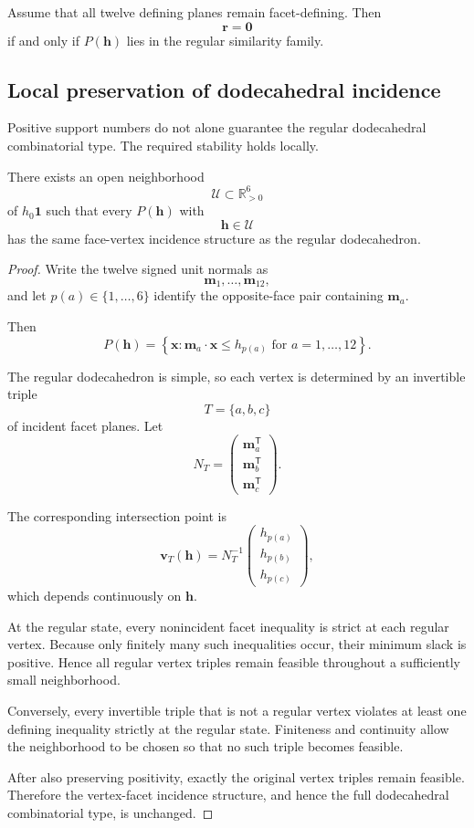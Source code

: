 \begin{corollary}
Assume that all twelve defining planes remain facet-defining. Then
\[
\mathbf r=\mathbf 0
\]
if and only if \(P(\mathbf h)\) lies in the regular similarity family.
\end{corollary}

\subsection{Local preservation of dodecahedral incidence}

Positive support numbers do not alone guarantee the regular dodecahedral
combinatorial type. The required stability holds locally.

\begin{theorem}
There exists an open neighborhood
\[
\mathcal U\subset\mathbb R_{>0}^6
\]
of \(h_0\mathbf 1\) such that every \(P(\mathbf h)\) with
\[
\mathbf h\in\mathcal U
\]
has the same face-vertex incidence structure as the regular dodecahedron.
\end{theorem}

\begin{proof}
Write the twelve signed unit normals as
\[
\mathbf m_1,\ldots,\mathbf m_{12},
\]
and let \(p(a)\in\{1,\ldots,6\}\) identify the opposite-face pair
containing \(\mathbf m_a\).

Then
\[
P(\mathbf h)
=
\left\{
\mathbf x:
\mathbf m_a\cdot\mathbf x
\le
h_{p(a)}
\text{ for }a=1,\ldots,12
\right\}.
\]

The regular dodecahedron is simple, so each vertex is determined by an
invertible triple
\[
T=\{a,b,c\}
\]
of incident facet planes. Let
\[
N_T
=
\begin{pmatrix}
\mathbf m_a^{\mathsf T}\\
\mathbf m_b^{\mathsf T}\\
\mathbf m_c^{\mathsf T}
\end{pmatrix}.
\]

The corresponding intersection point is
\[
\mathbf v_T(\mathbf h)
=
N_T^{-1}
\begin{pmatrix}
h_{p(a)}\\
h_{p(b)}\\
h_{p(c)}
\end{pmatrix},
\]
which depends continuously on \(\mathbf h\).

At the regular state, every nonincident facet inequality is strict at each
regular vertex. Because only finitely many such inequalities occur, their
minimum slack is positive. Hence all regular vertex triples remain feasible
throughout a sufficiently small neighborhood.

Conversely, every invertible triple that is not a regular vertex violates
at least one defining inequality strictly at the regular state. Finiteness
and continuity allow the neighborhood to be chosen so that no such triple
becomes feasible.

After also preserving positivity, exactly the original vertex triples
remain feasible. Therefore the vertex-facet incidence structure, and hence
the full dodecahedral combinatorial type, is unchanged.
\end{proof}

